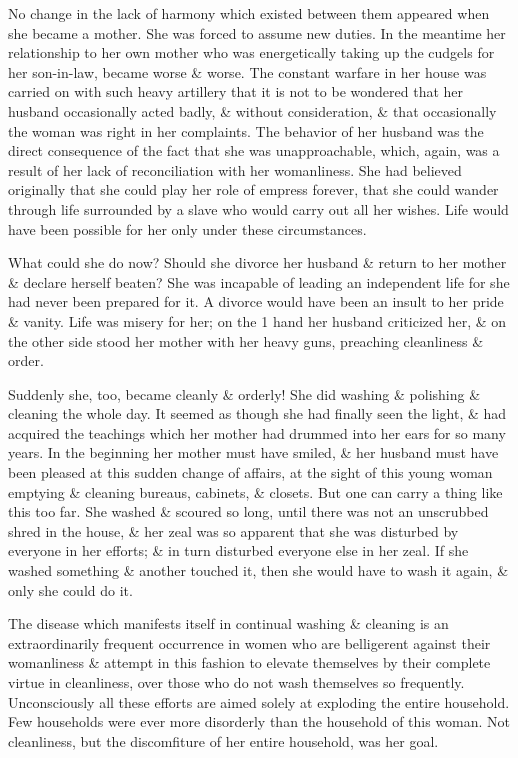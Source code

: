 \documentclass{article}
\begin{document}
No change in the lack of harmony which existed between them appeared when she became a mother. She was forced to assume new duties. In the meantime her relationship to her own mother who was energetically taking up the cudgels for her son-in-law, became worse \& worse. The constant warfare in her house was carried on with such heavy artillery that it is not to be wondered that her husband occasionally acted badly, \& without consideration, \& that occasionally the woman was right in her complaints. The behavior of her husband was the direct consequence of the fact that she was unapproachable, which, again, was a result of her lack of reconciliation with her womanliness. She had believed originally that she could play her role of empress forever, that she could wander through life surrounded by a slave who would carry out all her wishes. Life would have been possible for her only under these circumstances.

What could she do now? Should she divorce her husband \& return to her mother \& declare herself beaten? She was incapable of leading an independent life for she had never been prepared for it. A divorce would have been an insult to her pride \& vanity. Life was misery for her; on the 1 hand her husband criticized her, \& on the other side stood her mother with her heavy guns, preaching cleanliness \& order.

Suddenly she, too, became cleanly \& orderly! She did washing \& polishing \& cleaning the whole day. It seemed as though she had finally seen the light, \& had acquired the teachings which her mother had drummed into her ears for so many years. In the beginning her mother must have smiled, \& her husband must have been pleased at this sudden change of affairs, at the sight of this young woman emptying \& cleaning bureaus, cabinets, \& closets. But one can carry a thing like this too far. She washed \& scoured so long, until there was not an unscrubbed shred in the house, \& her zeal was so apparent that she was disturbed by everyone in her efforts; \& in turn disturbed everyone else in her zeal. If she washed something \& another touched it, then she would have to wash it again, \& only she could do it.

The disease which manifests itself in continual washing \& cleaning is an extraordinarily frequent occurrence in women who are belligerent against their womanliness \& attempt in this fashion to elevate themselves by their complete virtue in cleanliness, over those who do not wash themselves so frequently. Unconsciously all these efforts are aimed solely at exploding the entire household. Few households were ever more disorderly than the household of this woman. Not cleanliness, but the discomfiture of her entire household, was her goal.
\end{document}
